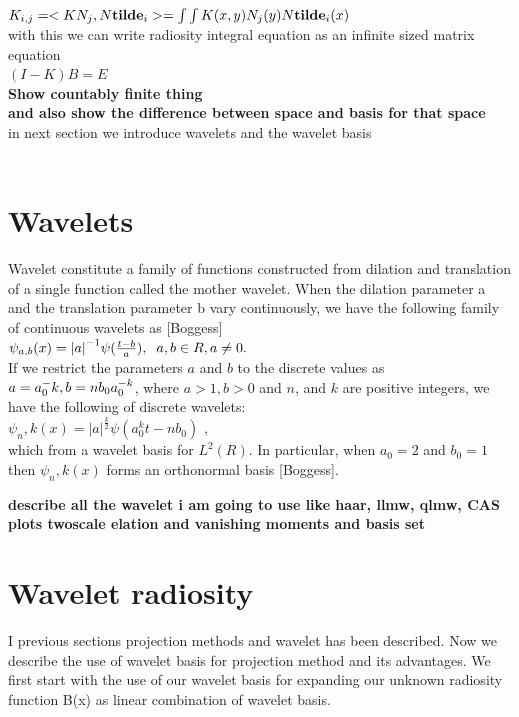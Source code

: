 \documentclass[12pt]{article}
\begin{document}
$K_{i,j}=<KN_j,N{\bf tilde}_i>=\int \int K(x,y)N_j(y)N{\bf tilde}_i(x)$\\

with this we can write radiosity integral equation as an infinite sized matrix equation\\

$(I-K)B=E$\\

{\bf Show countably finite thing \\ and also show the difference between space and basis for that space}\\

in next section we introduce wavelets and the wavelet basis
\\\\
\section{Wavelets}
Wavelet constitute a family of functions constructed from dilation and translation of a single function called the mother wavelet. When the dilation parameter a and the translation parameter b vary continuously, we have the following family of continuous wavelets as [Boggess]\\

$\psi_{a,b}(x) = {|a|}^{-1} \psi(\frac {t-b}{a})
,   \hspace{0.2cm} a,b \in R, a \neq 0.
$\\

If we restrict the parameters $a$ and $b$ to the discrete values as $a = a_0 ^-k, \\b = n b_0 a_0^{-k}$, where $a>1,b>0$ and $n$, and $k$ are positive integers, we have the following of discrete wavelets:\\

$\psi_n,k(x) = |a|^\frac{k}{2} \psi(a_0^k t - nb_0)$ ,\\
 which from a wavelet basis for $L^2(R)$. In particular, when $a_0 = 2$ and $b_0 = 1$ then $\psi_n,k (x)$ forms an orthonormal basis [Boggess].
 
 {\bf describe all the wavelet i am going to use like haar, llmw, qlmw, CAS 
 plots twoscale elation and vanishing moments and basis set}
 
 
\section{Wavelet radiosity}
I previous sections projection methods and wavelet has been described. Now we describe the use of wavelet basis for projection method and its advantages. 
We first start with the use of our wavelet basis for expanding our unknown radiosity function B(x) as linear combination of wavelet basis.\\
\end{document}
